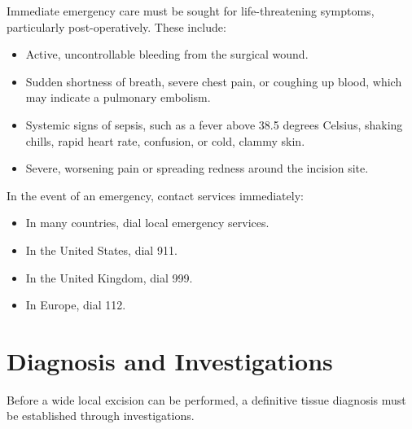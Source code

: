 Immediate emergency care must be sought for life-threatening symptoms, particularly post-operatively. These include:
\begin{itemize}
    \item Active, uncontrollable bleeding from the surgical wound.
    \item Sudden shortness of breath, severe chest pain, or coughing up blood, which may indicate a pulmonary embolism.
    \item Systemic signs of sepsis, such as a fever above 38.5 degrees Celsius, shaking chills, rapid heart rate, confusion, or cold, clammy skin.
    \item Severe, worsening pain or spreading redness around the incision site.
\end{itemize}
In the event of an emergency, contact services immediately:
\begin{itemize}
    \item In many countries, dial local emergency services.
    \item In the United States, dial 911.
    \item In the United Kingdom, dial 999.
    \item In Europe, dial 112.
\end{itemize}

\section*{Diagnosis and Investigations}
Before a wide local excision can be performed, a definitive tissue diagnosis must be established through investigations.

